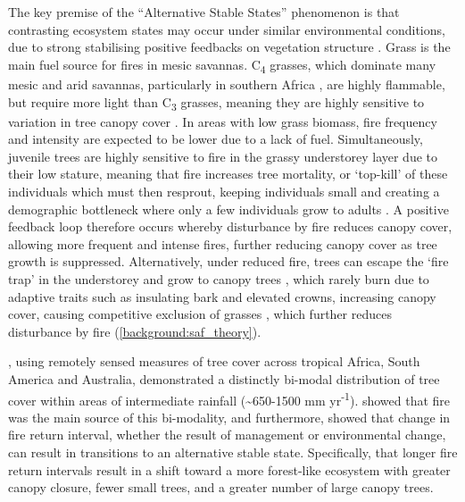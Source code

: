 \begin{refsection}
The key premise of the ``Alternative Stable States'' phenomenon is that contrasting ecosystem states may occur under similar environmental conditions, due to strong stabilising positive feedbacks on vegetation structure \citep{Staver2011}. Grass is the main fuel source for fires in mesic savannas. C\textsubscript{4} grasses, which dominate many mesic and arid savannas, particularly in southern Africa \citep{Still2003}, are highly flammable, but require more light than C\textsubscript{3} grasses, meaning they are highly sensitive to variation in tree canopy cover \citep{CharlesDominique2018}. In areas with low grass biomass, fire frequency and intensity are expected to be lower due to a lack of fuel. Simultaneously, juvenile trees are highly sensitive to fire in the grassy understorey layer due to their low stature, meaning that fire increases tree mortality, or `top-kill' of these individuals which must then resprout, keeping individuals small and creating a demographic bottleneck where only a few individuals grow to adults \citep{Bond1995, Ryan2011}. A positive feedback loop therefore occurs whereby disturbance by fire reduces canopy cover, allowing more frequent and intense fires, further reducing canopy cover as tree growth is suppressed. Alternatively, under reduced fire, trees can escape the `fire trap' in the understorey and grow to canopy trees \citep{Wakeling2011}, which rarely burn due to adaptive traits such as insulating bark and elevated crowns, increasing canopy cover, causing competitive exclusion of grasses \citep{Moustakas2013}, which further reduces disturbance by fire (\autoref{background:saf_theory}). 

\citet{Hirota2011}, using remotely sensed measures of tree cover across tropical Africa, South America and Australia, demonstrated a distinctly bi-modal distribution of tree cover within areas of intermediate rainfall (\textasciitilde{}650-1500 mm yr\textsuperscript{-1}). \citet{Staver2011} showed that fire was the main source of this bi-modality, and furthermore, \citet{Staver2017} showed that change in fire return interval, whether the result of management or environmental change, can result in transitions to an alternative stable state. Specifically, that longer fire return intervals result in a shift toward a more forest-like ecosystem with greater canopy closure, fewer small trees, and a greater number of large canopy trees.


\end{refsection}
